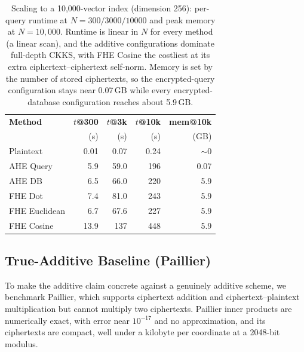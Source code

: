 \documentclass[sigconf,nonacm]{acmart}
\begin{document}
\begin{table}[t]
\centering\setlength{\tabcolsep}{5pt}
\begin{tabular}{lrrrr}
\toprule
\textbf{Method} & \textbf{$t$@300} & \textbf{$t$@3k} & \textbf{$t$@10k} & \textbf{mem@10k} \\
                & (s) & (s) & (s) & (GB) \\
\midrule
Plaintext      & 0.01 & 0.07 & 0.24 & $\sim$0 \\
AHE Query      & 5.9  & 59.0 & 196  & 0.07 \\
AHE DB         & 6.5  & 66.0 & 220  & 5.9 \\
FHE Dot        & 7.4  & 81.0 & 243  & 5.9 \\
FHE Euclidean  & 6.7  & 67.6 & 227  & 5.9 \\
FHE Cosine     & 13.9 & 137  & 448  & 5.9 \\
\bottomrule
\end{tabular}
\caption{Scaling to a 10{,}000-vector index (dimension 256): per-query runtime at $N{=}300/3000/10000$ and peak memory at $N{=}10{,}000$. Runtime is linear in $N$ for every method (a linear scan), and the additive configurations dominate full-depth CKKS, with FHE Cosine the costliest at its extra ciphertext--ciphertext self-norm. Memory is set by the number of stored ciphertexts, so the encrypted-query configuration stays near 0.07\,GB while every encrypted-database configuration reaches about 5.9\,GB.}
\label{tab:scaling}
\end{table}

\subsection{True-Additive Baseline (Paillier)}
\label{sec:paillier}
To make the additive claim concrete against a genuinely additive scheme, we benchmark Paillier, which supports ciphertext addition and ciphertext--plaintext multiplication but cannot multiply two ciphertexts. Paillier inner products are numerically exact, with error near $10^{-17}$ and no approximation, and its ciphertexts are compact, well under a kilobyte per coordinate at a 2048-bit modulus.
\end{document}
